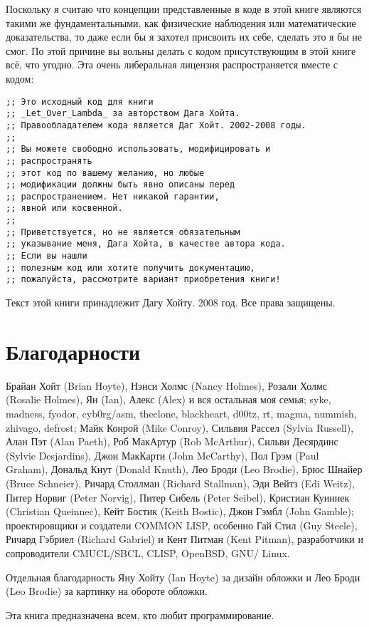 Поскольку я считаю что концепции представленные в коде в этой книге являются такими же фундаментальными, как физические наблюдения или математические доказательства, то даже если бы я захотел присвоить их себе, сделать это я бы не смог. По этой причине вы вольны делать с кодом присутствующим в этой книге всё, что угодно. Эта очень либеральная лицензия распространяется вместе с кодом:

\begin{verbatim}
;; Это исходный код для книги
;; _Let_Over_Lambda_ за авторством Дага Хойта.
;; Правообладателем кода является Даг Хойт. 2002-2008 годы.
;;
;; Вы можете свободно использовать, модифицировать и 
;; распространять
;; этот код по вашему желанию, но любые
;; модификации должны быть явно описаны перед
;; распространением. Нет никакой гарантии,
;; явной или косвенной.
;;
;; Приветствуется, но не является обязательным
;; указывание меня, Дага Хойта, в качестве автора кода.
;; Если вы нашли
;; полезным код или хотите получить документацию,
;; пожалуйста, рассмотрите вариант приобретения книги!
\end{verbatim}

Текст этой книги принадлежит Дагу Хойту. 2008 год. Все права защищены.

\section{Благодарности}\label{section_thanks}

Брайан Хойт (Brian Hoyte), Нэнси Холмс (Nancy Holmes), Розали Холмс (Rosalie Holmes), Ян (Ian), Алекс (Alex) и вся остальная моя семья; syke, madness, fyodor, cyb0rg/asm, theclone, blackheart, d00tz, rt, magma, nummish, zhivago, defrost; Майк Конрой (Mike Conroy), Сильвия Рассел (Sylvia Russell), Алан Пэт (Alan Paeth), Роб МакАртур (Rob McArthur), Сильви Десярдинс (Sylvie Desjardins), Джон МакКарти (John McCarthy), Пол Грэм (Paul Graham), Дональд Кнут (Donald Knuth), Лео Броди (Leo Brodie), Брюс Шнайер (Bruce Schneier), Ричард Столлман (Richard Stallman), Эди Вейтз (Edi Weitz), Питер Норвиг (Peter Norvig), Питер Сибель (Peter Seibel), Кристиан Куиннек (Christian Queinnec), Кейт Бостик (Keith Bostic), Джон Гэмбл (John Gamble); проектировщики и создатели COMMON LISP, особенно Гай Стил (Guy Steele), Ричард Гэбриел (Richard Gabriel) и Кент Питман (Kent Pitman), разработчики и сопроводители CMUCL/SBCL, CLISP, OpenBSD, GNU/ Linux.

Отдельная благодарность Яну Хойту (Ian Hoyte) за дизайн обложки и Лео Броди (Leo Brodie) за картинку на обороте обложки.

Эта книга предназначена всем, кто любит программирование.
